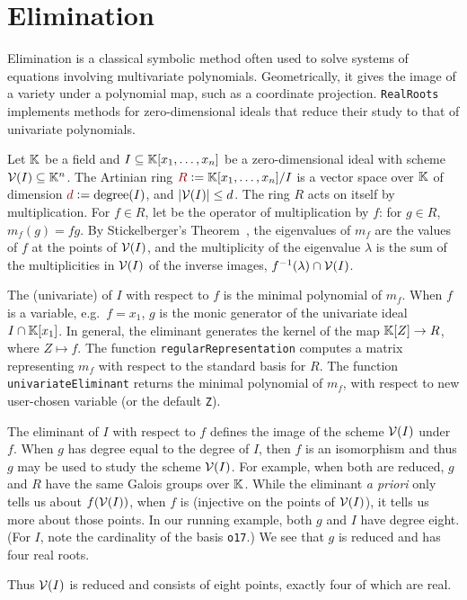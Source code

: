 


\section{Elimination}\label{S:two}

Elimination is a classical symbolic method often used to solve systems of equations involving multivariate polynomials.
Geometrically, it gives the image of a variety under a polynomial map, such as a coordinate projection.
\texttt{RealRoots} implements methods for zero-dimension\-al ideals that reduce their study to that of univariate polynomials.

Let  $\mathbb{K}$ be a field and $I\subseteq\mathbb{K}[x_1,\dotsc,x_n]$ be a zero-dimension\-al ideal  with scheme $\mathcal{V}(I)\subseteq\mathbb{K}^n$.
The Artinian ring $\defcolor{R}\vcentcolon=\KK[x_1,\dotsc,x_n]/I$ is a vector space over $\mathbb{K}$ of dimension
$\defcolor{d}\vcentcolon=\mbox{degree}(I)$, and $|\mathcal{V}(I)|\leq d$.
The ring $R$ acts on itself by multiplication.
For $f\in R$, let  be the operator of multiplication by $f$: for $g\in R$, $m_f(g)=fg$.
By Stickelberger's Theorem~\cite{Cox2021}, the eigenvalues of $m_f$ are the values of $f$ at the  points of $\mathcal{V}(I)$,
and the multiplicity of the eigenvalue $\lambda$ is the sum of the multiplicities in $\mathcal{V}(I)$ of the inverse images,
$f^{-1}(\lambda)\cap\mathcal{V}(I)$. 


The (univariate)   of $I$ with respect to $f$ is the minimal polynomial of $m_f$.
When $f$ is a variable, e.g.\ $f=x_1$, $g$ is the monic generator of the univariate ideal $I\cap\mathbb{K}[x_1]$.
In general, the eliminant generates the kernel of the map $\mathbb{K}[Z]\to R$, where $Z\mapsto f$.
The function \texttt{regularRepresentation} computes a matrix representing $m_f$ with respect to the standard basis for $R$.
The function \texttt{univariateEliminant} returns the minimal polynomial of $m_f$, with respect to new user-chosen variable
(or the default \texttt{Z}). 
%
\begin{leftbar}

\end{leftbar}
%
The eliminant  of $I$ with respect to $f$ defines the image of the scheme $\mathcal{V}(I)$ under $f$.
When $g$ has degree equal to the degree of $I$, then $f$ is an isomorphism and thus $g$ may be used to study the scheme
$\mathcal{V}(I)$.
For example, when both are reduced, $g$ and $R$ have the same Galois groups over $\mathbb{K}$.
While the eliminant {\it a priori} only tells us about $f(\mathcal{V}(I))$, when $f$ is  (injective on the
points of $\mathcal{V}(I)$), it tells us more about those points.
In our running example, both $g$ and $I$ have degree eight. (For $I$, note the cardinality of the basis \texttt{o17}.)
We see that $g$ is reduced and has four real roots.
%
\begin{leftbar}

\end{leftbar}
%
Thus $\mathcal{V}(I)$ is reduced and consists of eight points, exactly four of which are real.

